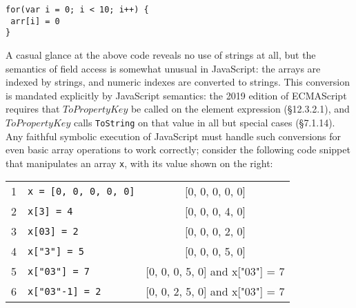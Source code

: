 \documentclass[sigplan,review,anonymous]{acmart}\settopmatter{printfolios=true,printccs=false,printacmref=false}
\begin{document}




\begin{verbatim}
for(var i = 0; i < 10; i++) {
 arr[i] = 0
}
\end{verbatim}

A casual glance at the above code reveals no use of strings at all, but the semantics of field access is somewhat unusual in JavaScript: the arrays are indexed by strings, and numeric indexes are converted to strings. This conversion is mandated explicitly by JavaScript semantics: the 2019 edition of ECMAScript \cite{?} requires that $ToPropertyKey$ be called on the element expression (\S{12.3.2.1}), and $ToPropertyKey$ calls {\tt{ToString}} on that value in all but special cases (\S{7.1.14}). Any faithful symbolic execution of JavaScript must handle such conversions for even basic array operations to work correctly; consider the following code snippet that manipulates an array \texttt{x}, with its value shown on the right:

\hspace{-4mm}\begin{tabular}{l|l|c}
1&	{\tt{x = [0, 0, 0, 0, 0]}} & [0, 0, 0, 0, 0] \\
2&	{\tt{x[3] = 4}} & [0, 0, 0, 4, 0] \\
3&	{\tt{x[03] = 2}} & [0, 0, 0, 2, 0] \\
4&	{\tt{x["3"] = 5}} & [0, 0, 0, 5, 0] \\
5&	{\tt{x["03"] = 7}} & [0, 0, 0, 5, 0] and x["03"] = 7\\
6&	{\tt{x["03"-1] = 2}} & [0, 0, 2, 5, 0] and x["03"] = 7\\
\end{tabular}
\end{document}
